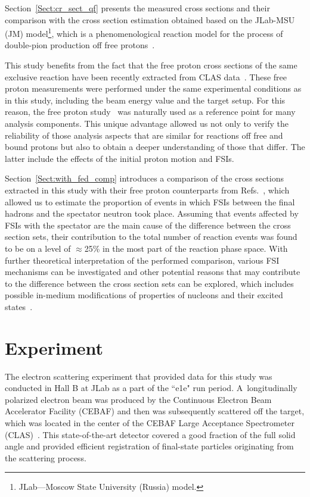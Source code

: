 \documentclass[prc,twocolumn,superscriptaddress,showpacs,amssymb,amsmath,amsfonts,aps,nofootinbib]{revtex4-1}
\begin{document}
Section~\ref{Sect:cr_sect_qf} presents the measured cross sections and their comparison with the cross section estimation obtained based on the JLab-MSU (JM) model\footnote[1]{JLab---Moscow State University (Russia) model.}, which is a phenomenological reaction model for the process of double-pion production off free protons~\cite{Mokeev:2008iw,Mokeev:2012vsa,Mokeev:2015lda}.


This study benefits from the fact that the free proton cross sections of the same exclusive reaction have been recently extracted from CLAS data~\cite{Fed_an_note:2017,Fed_paper_2018}. These free proton measurements were performed under the same experimental conditions as in this study, including the beam energy value and the target setup. For this reason, the free proton study~\cite{Fed_an_note:2017,Fed_paper_2018} was naturally used as a reference point for many analysis components. This unique advantage allowed us not only to verify the reliability of those analysis aspects that are similar for reactions off free and bound protons but also to obtain a deeper understanding of those that differ. The latter include the effects of the initial proton motion and FSIs.


Section~\ref{Sect:with_fed_comp} introduces a comparison of the cross sections extracted in this study with their free proton counterparts from Refs.\!~\cite{Fed_an_note:2017,Fed_paper_2018}, which allowed us to estimate the proportion of events in which FSIs between the final hadrons and the spectator neutron took place. Assuming that events affected by FSIs with the spectator are the main cause of the difference between the cross section sets, their contribution to the total number of reaction events was found to be on a level of $\approx$25\% in the most part of the reaction phase space. With further theoretical interpretation of the performed comparison, various FSI mechanisms can be investigated and other potential reasons that may contribute to the difference between the cross section sets can be explored, which includes possible in-medium modifications of properties of nucleons and their excited states~\cite{Mokeev:1995fy,Bianchi:1994ax,Ahrens:1986hn,Krusche:2004xz,Noble:1980my}.



\section{Experiment}
\label{Chapt:experiment}

The electron scattering experiment that provided data for this study was conducted in Hall B at JLab as a part of the ``e1e" run period. A~longitudinally polarized electron beam was produced by the Continuous Electron Beam Accelerator Facility (CEBAF) and then was subsequently scattered off the target, which was located in the center of the CEBAF Large Acceptance Spectrometer (CLAS)~\cite{Mecking:2003zu}. This state-of-the-art detector covered a good fraction of the full solid angle and provided efficient registration of final-state particles originating from the scattering process.
\end{document}
